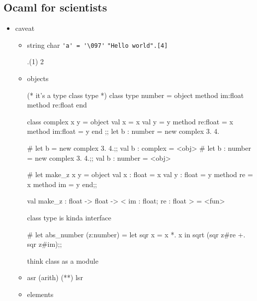 \subsection{Ocaml for scientists}
\label{sec:ocaml-scientists}
\begin{itemize}
\item caveat
  \begin{itemize}
  \item string char
    \verb|'a' = '\097'|
    \verb|"Hello world".[4]|

\begin{alternate}
  [|1;2;3|].(1)
  2 
\end{alternate}

  \item objects

\begin{ocamlcode}

(* it's a type class type *)
class type number = object
  method im:float
  method re:float 
end
\end{ocamlcode}

\begin{ocamlcode}
class complex x y = object 
    val x = x
    val y = y
    method re:float = x
    method im:float = y
end ;;
let b : number = new complex 3. 4.
\end{ocamlcode}

\begin{alternate}
# let b = new complex 3. 4.;;
val b : complex = <obj>
# let b : number = new complex 3. 4.;;
val b : number = <obj>
 \end{alternate}

\begin{ocamlcode} 
# let make_z x y = object
    val x : float = x
    val y : float = y
    method re = x
    method im = y
    end;;
  \end{ocamlcode}
\begin{ocamlcode}  
val make_z : float -> float -> < im : float; re : float > = <fun>
\end{ocamlcode}

class type is kinda interface

  
\begin{ocamlcode}
# let abs_number (z:number) = 
       let sqr x = x *. x in 
       sqrt (sqr z#re +. sqr z#im);;
     \end{ocamlcode}
     
think class as a module 


  \item asr (arith) (**) lsr
  \item elements


\end{itemize}
\end{itemize}

